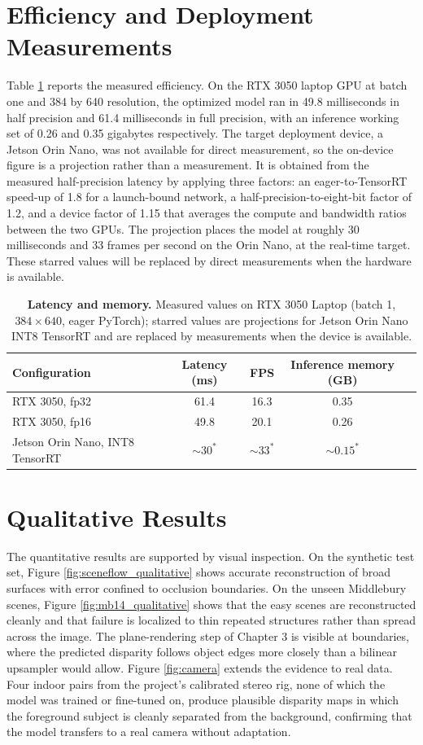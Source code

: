\section{Efficiency and Deployment Measurements}
Table \ref{tab:latency} reports the measured efficiency. On the RTX 3050
laptop GPU at batch one and 384 by 640 resolution, the optimized model ran
in 49.8 milliseconds in half precision and 61.4 milliseconds in full
precision, with an inference working set of 0.26 and 0.35 gigabytes
respectively. The target deployment device, a Jetson Orin Nano, was not
available for direct measurement, so the on-device figure is a projection
rather than a measurement. It is obtained from the measured half-precision
latency by applying three factors: an eager-to-TensorRT speed-up of 1.8
for a launch-bound network, a half-precision-to-eight-bit factor of 1.2,
and a device factor of 1.15 that averages the compute and bandwidth ratios
between the two GPUs. The projection places the model at roughly 30
milliseconds and 33 frames per second on the Orin Nano, at the real-time
target. These starred values will be replaced by direct measurements when
the hardware is available.

\begin{table}[!htbp]
\centering
\caption{\textbf{Latency and memory.} Measured values on RTX 3050 Laptop (batch 1, $384\times 640$, eager PyTorch); starred values are projections for Jetson Orin Nano INT8 TensorRT and are replaced by measurements when the device is available.}
\label{tab:latency}
\small
\begin{tabular}{lcccc}
\toprule
Configuration & Latency (ms) & FPS & Inference memory (GB)\\
\midrule
RTX 3050, fp32 & 61.4 & 16.3 & 0.35\\
RTX 3050, fp16 & 49.8 & 20.1 & 0.26\\
Jetson Orin Nano, INT8 TensorRT & ${\sim}30^{*}$ & ${\sim}33^{*}$ & ${\sim}0.15^{*}$\\
\bottomrule
\end{tabular}
\end{table}

\section{Qualitative Results}
The quantitative results are supported by visual inspection. On the
synthetic test set, Figure \ref{fig:sceneflow_qualitative} shows accurate
reconstruction of broad surfaces with error confined to occlusion
boundaries. On the unseen Middlebury scenes, Figure
\ref{fig:mb14_qualitative} shows that the easy scenes are reconstructed
cleanly and that failure is localized to thin repeated structures rather
than spread across the image. The plane-rendering step of Chapter 3 is
visible at boundaries, where the predicted disparity follows object edges
more closely than a bilinear upsampler would allow. Figure
\ref{fig:camera} extends the evidence to real data. Four indoor pairs from
the project's calibrated stereo rig, none of which the model was trained
or fine-tuned on, produce plausible disparity maps in which the foreground
subject is cleanly separated from the background, confirming that the
model transfers to a real camera without adaptation.

